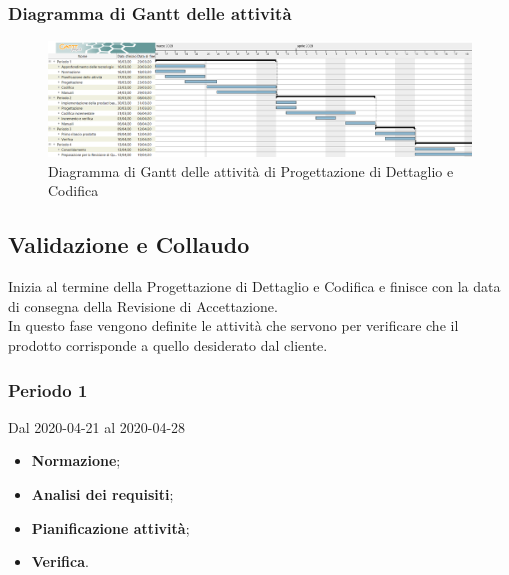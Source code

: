 \newpage
\begin{landscape}
	\subsubsection{Diagramma di Gantt delle attività}
	\pagestyle{empty}
	\begin{figure}[h]
			\caption{Diagramma di Gantt delle attività di Progettazione di Dettaglio e Codifica}
		\begin{center}	
				\includegraphics[scale=0.5]{sezioni/DiagrammiGantt/Progettazione-di-dettaglio.png}	
		\end{center}
		
	\end{figure}
\end{landscape}

\subsection{Validazione e Collaudo}
Inizia al termine della Progettazione di Dettaglio e Codifica e finisce con la data di consegna della Revisione di Accettazione.
\\In questo fase vengono definite le attività che servono per verificare che il prodotto corrisponde a quello desiderato dal cliente.
\subsubsection{Periodo 1} 
Dal 2020-04-21 al 2020-04-28
\begin{itemize}
	\item \textbf{Normazione};
	\item \textbf{Analisi dei requisiti};
	\item \textbf{Pianificazione attività};
	\item \textbf{Verifica}.
\end{itemize}
